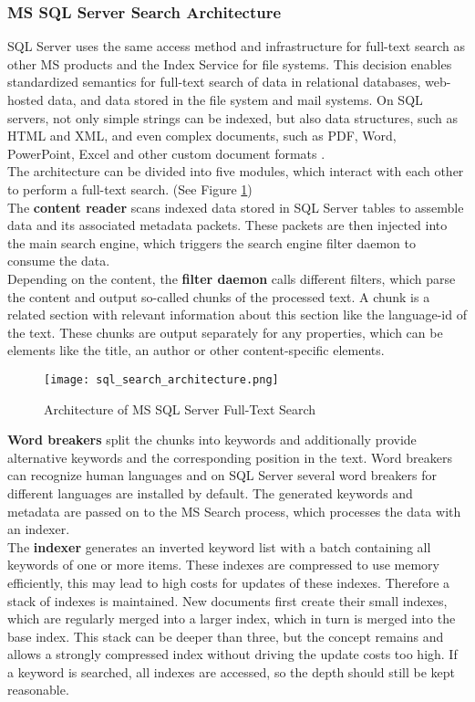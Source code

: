 \subsubsection{MS SQL Server Search Architecture}
\ac{SQL} Server uses the same access method and infrastructure for full-text search as other \ac{MS} products and the Index Service for file systems. This decision enables standardized semantics for full-text search of data in relational databases, web-hosted data, and data stored in the file system and mail systems. On \ac{SQL} servers, not only simple strings can be indexed, but also data structures, such as \ac{HTML} and \ac{XML}, and even complex documents, such as \ac{PDF}, Word, PowerPoint, Excel and other custom document formats \parencite[cf.][p. 7]{hamilton_microsoft_2001}.\\
The architecture can be divided into five modules, which interact with each other to perform a full-text search. (See Figure \ref{fig:sql_search_architecture})\\
The \textbf{content reader} scans indexed data stored in \ac{SQL} Server tables to assemble data and its associated metadata packets. These packets are then injected into the main search engine, which triggers the search engine filter daemon to consume the data.\\
Depending on the content, the \textbf{filter daemon} calls different filters, which parse the content and output so-called chunks of the processed text. A chunk is a related section with relevant information about this section like the language-id of the text. These chunks are output separately for any properties, which can be elements like the title, an author or other content-specific elements.
\begin{figure}[H]
    \caption{Architecture of MS SQL Server Full-Text Search}
    \label{fig:sql_search_architecture}
    \texttt{[image: sql\_search\_architecture.png]}
    \\
    \cite[Source:][p. 8]{hamilton_microsoft_2001}
\end{figure}
\textbf{Word breakers} split the chunks into keywords and additionally provide alternative keywords and the corresponding position in the text. Word breakers can recognize human languages and on \ac{SQL} Server several word breakers for different languages are installed by default. The generated keywords and metadata are passed on to the \ac{MS} Search process, which processes the data with an indexer.\\
The \textbf{indexer} generates an inverted keyword list with a batch containing all keywords of one or more items. These indexes are compressed to use memory efficiently, this may lead to high costs for updates of these indexes. Therefore a stack of indexes is maintained. New documents first create their small indexes, which are regularly merged into a larger index, which in turn is merged into the base index. This stack can be deeper than three, but the concept remains and allows a strongly compressed index without driving the update costs too high. If a keyword is searched, all indexes are accessed, so the depth should still be kept reasonable.\\
